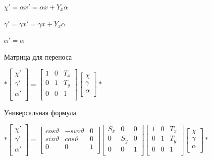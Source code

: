 \documentclass{article}
\begin{document}
$\chi ' = \alpha x' = \alpha x + Y_x \alpha$

$\gamma ' = \gamma x' = \gamma x + Y_x \alpha$

$\alpha ' = \alpha$


Матрица для переноса

$*\begin{bmatrix}
    \chi' \\
    \gamma ' \\ 
    \alpha ' \\

\end{bmatrix}
=
\begin{bmatrix}
    1 & 0  & T_x \\[0.3em]
    0 & 1  & T_y \\[0.3em]
    0 & 0  & 1 \\[0.3em]
\end{bmatrix}
\begin{bmatrix}
    \chi \\
    \gamma  \\ 
    \alpha  \\
\end{bmatrix}*$

Универсальная формула

$*\begin{bmatrix}
    \chi' \\
    \gamma ' \\ 
    \alpha ' \\

\end{bmatrix}
=
\begin{bmatrix}
    cos \vartheta & -sin \vartheta  & 0 \\[0.3em]
    sin \vartheta &  cos \vartheta  & 0 \\[0.3em]
    0 & 0  & 1 \\[0.3em]
\end{bmatrix}
\begin{bmatrix}
    S_x & 0  & 0 \\[0.3em]
    0 & S_y  & 0 \\[0.3em]
    0 & 0  & 1 \\[0.3em]
\end{bmatrix}
\begin{bmatrix}
    1 & 0  & T_x \\[0.3em]
    0 & 1  & T_y \\[0.3em]
    0 & 0  & 1 \\[0.3em]
\end{bmatrix}
\begin{bmatrix}
    \chi \\
    \gamma  \\ 
    \alpha  \\
\end{bmatrix}*$
\end{document}
